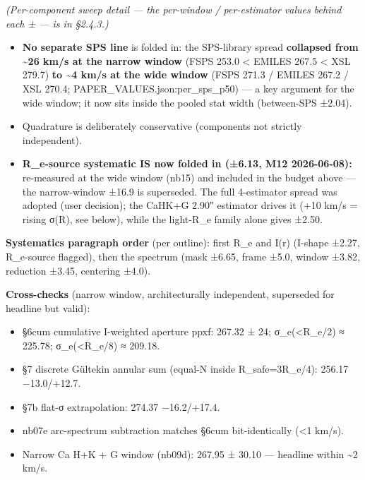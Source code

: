 \documentclass[
]{article}
\providecommand{\tightlist}{%
  \setlength{\itemsep}{0pt}\setlength{\parskip}{0pt}}
\newcommand{\BreakablePath}[1]{{\ttfamily\sloppy #1}}
\begin{document}
\emph{(Per-component sweep detail --- the per-window / per-estimator
values behind each ± --- is in §2.4.3.)}

\begin{itemize}
\tightlist
\item
  \textbf{No separate SPS line} is folded in: the SPS-library spread
  \textbf{collapsed from \textasciitilde26 km/s at the narrow window}
  (FSPS 253.0 \textless{} EMILES 267.5 \textless{} XSL 279.7) \textbf{to
  \textasciitilde4 km/s at the wide window} (FSPS 271.3 / EMILES 267.2 /
  XSL 270.4;
  \BreakablePath{PAPER\_\discretionary{}{}{}VALUES.\discretionary{}{}{}json:per\_\discretionary{}{}{}sps\_\discretionary{}{}{}p50})
  --- a key argument for the wide window; it now sits inside the pooled
  stat width (between-SPS ±2.04).
\item
  Quadrature is deliberately conservative (components not strictly
  independent).
\item
  \textbf{R\_e-source systematic IS now folded in (±6.13, M12
  2026-06-08):} re-measured at the wide window (nb15) and included in
  the budget above --- the narrow-window ±16.9 is superseded. The full
  4-estimator spread was adopted (user decision); the CaHK+G 2.90″
  estimator drives it (+10 km/s = rising σ(R), see below), while the
  light-R\_e family alone gives ±2.50.
\end{itemize}

\textbf{Systematics paragraph order} (per outline): first R\_e and I(r)
(I-shape ±2.27, R\_e-source flagged), then the spectrum (mask ±6.65,
frame ±5.0, window ±3.82, reduction ±3.45, centering ±4.0).

\textbf{Cross-checks} (narrow window, architecturally independent,
superseded for headline but valid):

\begin{itemize}
\tightlist
\item
  §6cum cumulative I-weighted aperture ppxf: 267.32 ± 24;
  σ\_e(\textless R\_e/2) ≈ 225.78; σ\_e(\textless R\_e/8) ≈ 209.18.
\item
  §7 discrete Gültekin annular sum (equal-N inside R\_safe=3R\_e/4):
  256.17 −13.0/+12.7.
\item
  §7b flat-σ extrapolation: 274.37 −16.2/+17.4.
\item
  nb07e arc-spectrum subtraction matches §6cum bit-identically
  (\textless1 km/s).
\item
  Narrow Ca H+K + G window (nb09d): 267.95 ± 30.10 --- headline within
  \textasciitilde2 km/s.
\end{itemize}
\end{document}
